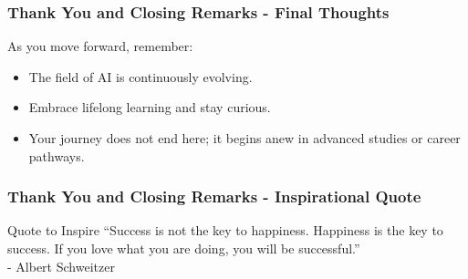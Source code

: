 \documentclass[aspectratio=169]{beamer}
\begin{document}
\begin{frame}[fragile]
    \frametitle{Thank You and Closing Remarks - Final Thoughts}
    As you move forward, remember:
    \begin{itemize}
        \item The field of AI is continuously evolving.
        \item Embrace lifelong learning and stay curious.
        \item Your journey does not end here; it begins anew in advanced studies or career pathways.
    \end{itemize}
\end{frame}

\begin{frame}[fragile]
    \frametitle{Thank You and Closing Remarks - Inspirational Quote}
    \begin{block}{Quote to Inspire}
        “Success is not the key to happiness. Happiness is the key to success. If you love what you are doing, you will be successful.”\\
        - Albert Schweitzer
    \end{block}
\end{frame}
\end{document}
